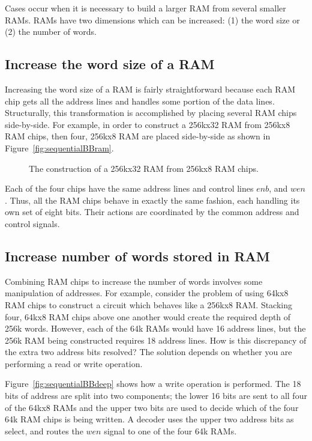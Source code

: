 Cases occur when it is necessary to build a larger RAM from several
smaller RAMs.  RAMs have two dimensions which can be increased: (1) the word size or 
(2) the number of words.  

\subsection{Increase the word size of a RAM}
Increasing the word size of a RAM is fairly straightforward because 
each RAM chip gets all the address lines and handles some portion of 
the data lines.  Structurally, this transformation is accomplished by
placing several RAM chips side-by-side. For example, in order 
to construct a 256kx32 RAM from 256kx8 RAM chips, then four, 256kx8 RAM are 
placed side-by-side as shown in Figure~\ref{fig:sequentialBBram}.

\begin{figure}[ht]
\caption{The construction of a 256kx32 RAM from 256kx8 RAM chips.}
\label{fig:sequentialBBwide}
\end{figure}

Each of the four chips have the same address lines and control
lines $enb$, and $wen$.  Thus, all the RAM chips behave in exactly the same 
fashion, each handling its own set of eight bits.  Their actions are coordinated
by the common address and control signals.

\subsection{Increase number of words stored in RAM}
Combining RAM chips to increase the number of words involves some manipulation
of addresses.  For example, consider the problem of using 64kx8 RAM chips to 
construct a circuit which behaves like a 256kx8 RAM.  Stacking four, 64kx8 RAM
chips above one another would create the required depth of 256k words.  However,
each of the 64k RAMs would have 16 address lines, but the 256k RAM being 
constructed requires 18 address lines.  How is this discrepancy of the extra 
two address bits resolved?  The solution depends on whether you are 
performing a read or write operation.

Figure~\ref{fig:sequentialBBdeep} shows how a write operation is performed.
The 18 bits of address are split into two 
components; the lower 16 bits are sent to all four of the 64kx8 RAMs 
and the upper two bits are used to decide which of the four 64k RAM chips 
is being written.  A decoder uses the upper two address bits as select, and routes 
the $wen$ signal to one of the four 64k RAMs.

